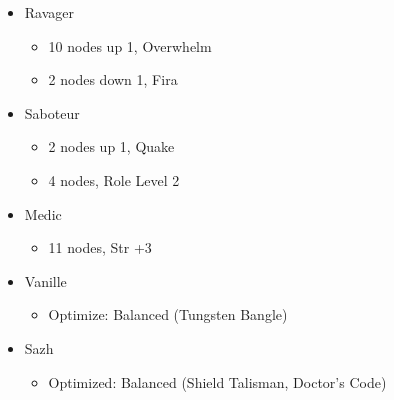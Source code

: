 \begin{multicols}{2}
\begin{menu}
\begin{itemize}
\begin{itemize}
				            \begin{itemize}
					            \item Ravager
					                  \begin{itemize}
						                  \item 10 nodes up 1, Overwhelm
						                  \item 2 nodes down 1, Fira
					                  \end{itemize}
					            \item Saboteur
					                  \begin{itemize}
						                  \item 2 nodes up 1, Quake
						                  \item 4 nodes, Role Level 2
					                  \end{itemize}
					            \item Medic
					                  \begin{itemize}
						                  \item 11 nodes, Str +3
					                  \end{itemize}
				            \end{itemize}
			      \end{itemize}
			      \columnbreak
			      \equip
			      \begin{itemize}
				      \item Vanille
				            \begin{itemize}
					            \item \begin{flushleft}Optimize: Balanced (Tungsten Bangle)\end{flushleft}
				            \end{itemize}
				      \item Sazh
				            \begin{itemize}
					            \item \begin{flushleft}Optimized: Balanced (Shield Talisman, Doctor's Code)\end{flushleft}
				            \end{itemize}
			      \end{itemize}
		\end{itemize}
	\end{menu}
	\renewcommand{\first}{[1] Slash \& Burn (\com/\rav)}
	\renewcommand{\second}{[2] War \& Peace (\com/\med)}
	\renewcommand{\third}{[3] Tide Turner (\syn/\sab)}
	\renewcommand{\fourth}{[4] }
	\renewcommand{\fifth}{[5] Undermine (\rav/\sab)}
	\renewcommand{\sixth}{[6] Divide \& Conquer (\com/\sab)}


\end{multicols}
